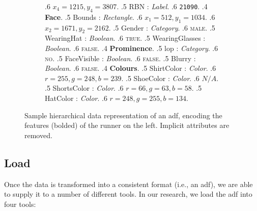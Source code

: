 \begin{figure}
\begin{subfigure}[b]{0.50\textwidth}
{      .6 $x_{4} = 1215, y_{4} = 3807$.
      .5 RBN : \textit{Label}. 
      .6 \texttt{21090}.
      .4 \textbf{Face}.
      .5 Bounds : \textit{Rectangle}.    
      .6 $x_{1} = 512, y_{1} = 1034$.
      .6 $x_{2} = 1671, y_{2} = 2162$.
      .5 Gender : \textit{Category}.
      .6 \textsc{male}.
      .5 WearingHat : \textit{Boolean}.
      .6 \textsc{true}.
      .5 WearingGlasses : \textit{Boolean}.
      .6 \textsc{false}.
      .4 \textbf{Prominence}.
      .5 \gls{lop} : \textit{Category}.
      .6 \textsc{no}.
      .5 FaceVisible : \textit{Boolean}.
      .6 \textsc{false}.
      .5 Blurry : \textit{Boolean}.
      .6 \textsc{false}.
      .4 \textbf{Colours}.
      .5 ShirtColor : \textit{Color}.
      .6 $r = 255, g = 248, b = 239$.
      .5 ShoeColor : \textit{Color}.
      .6 $N/A$.
      .5 ShortsColor : \textit{Color}.
      .6 $r = 66, g = 63, b = 58$.
      .5 HatColor : \textit{Color}.
      .6 $r = 248, g = 255, b = 134$.
    }  
  \end{subfigure}
  \caption[Sample representation of an ADF]{Sample hierarchical data representation of an \gls{adf}, encoding the features (bolded) of the runner on the left. Implicit attributes are removed.}
  \label{fig:dataset:adf_representation}
\end{figure}

\subsection{Load}
\label{sec:dataset:process:load}

Once the data is transformed into a consistent format (i.e., an \gls{adf}), we are able to supply it to a number of different tools. In our research, we load the \gls{adf} into four tools:

